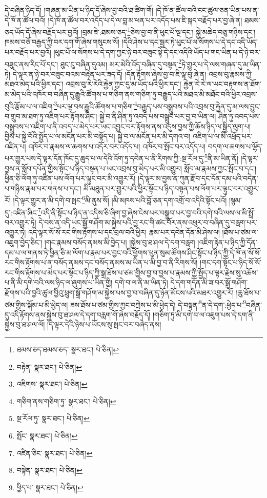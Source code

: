 དེ་བཞིན་ཉིད་དོ། །གཞན་མ་ཡིན་པ་ཉིད་དོ་ཞེས་བྱ་བའི་ཐ་ཚིག་གོ། །དེ་ཁོ་ན་ཚོལ་བའི་ངང་ཚུལ་ཅན་ཡིན་པས་ན་དེ་ཁོ་ན་ཚོལ་བའོ། །དེ་ཁོ་ན་ཚོལ་བར་འདོད་པ་དེ་ལ་བླ་མ་ཕན་པར་འདོད་པས་ཇི་སྐད་བརྗོད་པར་བྱ་ཞེ་ན། ཐམས་ཅད་ཡོད་དོ་ཞེས་བརྗོད་པར་བྱའོ། །བྲམ་ཟེ་:ཐམས་ཅད་\footnote{ཐམས་ཅད་ཐམས་ཅད་  སྣར་ཐང་།  པེ་ཅིན། }ཅེས་བྱ་བ་ནི་ཕུང་པོ་ལྔ་དང་། སྐྱེ་མཆེད་བཅུ་གཉིས་དང་། ཁམས་བཅོ་བརྒྱད་ཀྱི་བར་དག་གོ་ཞེས་གསུངས་སོ། །དེའི་ཤེས་པ་དང་སྦྱར་ཏེ་ཕུང་པོ་ལ་སོགས་པ་དེ་དང་འདི་ཡོད་པར་བརྗོད་པར་བྱའོ། །ཕུང་པོ་ལ་སོགས་པ་དེ་དག་ཀྱང་ཉེ་བར་བཟུང་སྟེ་དེ་དང་འདིའི་ཡོད་པ་གང་ཡིན་པ་དེ་ཉེ་བར་བཟུང་ནས་རིང་པོ་དང་། ཐུང་ངུ་བཞིན་དུའམ། མར་མེའི་འོད་བཞིན་དུ་བསྟན་\footnote{བརྟེན་  སྣར་ཐང་།  པེ་ཅིན། }ཏེ་གྱུར་པ་དེ་ལས་གཞན་དུ་མ་ཡིན་ཏེ། དེ་ལྟར་ན་ཉེ་བར་བཟུང་བའམ་བརྟེན་པར་ཟད་དོ། །དོན་རྟོགས་ཞེས་བྱ་བ་ཇི་ལྟ་བུ་ཞེ་ན། འབྲས་བུ་རྣམས་ཀྱི་མཐའ་མེད་པའི་ཕྱིར་དང་། འབྲས་བུ་རེ་རེའི་རྐྱེན་ཀྱང་དུ་མ་ཡོད་པའི་ཕྱིར་དང་། རྐྱེན་རེ་རེ་ལ་ཡང་བརྟགས་ན་ཐོག་མ་མེད་པའི་འཁོར་བ་བཞིན་དུ་རྒྱུའི་ཚོགས་པ་གཅིག་ནས་གཅིག་ཏུ་བརྒྱུད་པའི་མཐའ་མི་མཐོང་བའི་ཕྱིར་འབྲས་བུའི་རྩོམ་པ་ལ་འཇིག་\footnote{འཇིགས་  སྣར་ཐང་།  པེ་ཅིན། }པར་ལྟ་བས་རྒྱུའི་ཚོགས་པ་གཅིག་\footnote{གཅིག་ནས་གཅིག་ཏུ་  སྣར་ཐང་།  པེ་ཅིན། }བརྒྱུད་པས་བསྒྲུབས་པའི་འབྲས་བུ་རྐྱེན་དུ་མ་ལས་བྱུང་བ་གྲུབ་མ་ཐག་ཏུ་འཇིག་པར་རྟོགས་ཤིང་། སྐྱེ་བ་ནི་ཤིན་ཏུ་འབད་པས་བསྒྲུབ་པར་བྱ་བ་ཡིན་ལ། ཤིན་ཏུ་འབད་པས་བསྒྲུབས་པ་འཇིག་པ་ནི་འབད་པ་མེད་པར་ཡང་འབྱུང་བར་རྟོགས་ནས་འདུས་བྱས་ཀྱི་ཆོས་ཉིད་ལ་སྒྱིད་ལུག་པ། བྱིས་པ་སྐྱེ་བོའི་སྤྱོད་པ་ལ་མངོན་པར་མི་བསྟོད་པ། སྐྱེ་བ་ལ་མངོན་པར་མི་དགའ་བ། འཇིག་པ་ལ་མི་འཕྲོད་པར་འཛིན་པ། འཁོར་བ་རྣམས་ལ་ཆགས་པ་འདོར་བར་འདོད་པ། འཁོར་བ་སྤོང་བར་འདོད་པ། བདག་ལ་ཆགས་པ་ལྷོད་པར་གྱུར་པས་དེ་ལྟར་དོན་ཁོང་དུ་ཆུད་པ་ལ་དེའི་འོག་ཏུ་དབེན་པ་ནི་རིགས་ཀྱི་:སྔ་རོལ་དུ་\footnote{སྔ་རོལ་ཏུ་  སྣར་ཐང་།  པེ་ཅིན། }ནི་མ་ཡིན་ནོ། །དེ་ལྟར་བྱས་ན་སློབ་དཔོན་གྱིས་སྟོང་པ་ཉིད་བསྟན་པ་ཡང་འབྲས་བུ་མེད་པར་མི་འགྱུར། སློབ་མ་རྣམས་ཀྱང་སྤོང་བ་དང་། ཕྱིན་ཅི་ལོག་ཏུ་འཛིན་པས་ལོག་པར་ལྟུང་བར་མི་འགྱུར་རོ། །དེ་ལྟར་མ་བྱས་ན་ཀུན་རྫོབ་དང་དོན་དམ་པའི་བདེན་པ་གཉིས་རྣམ་པར་གནས་པ་དང་། མི་མཐུན་པར་གྱུར་པའི་ཕྱིར་སྟོང་པ་ཉིད་བསྟན་པས་ལོག་པར་ལྟུང་བར་འགྱུར་རོ། །དེ་ལྟར་གྱུར་ན་མི་དགེ་བ་སྤང་\footnote{སྤོང་  སྣར་ཐང་།  པེ་ཅིན། }མི་ནུས་སོ། །མི་མཁས་པའི་བློ་ཅན་དག་འགྲོ་བ་འདིའི་སྟོང་པའོ། །སྙམ་དུ་:འཛིན་ཞིང་\footnote{འཛིན་ཅིང་  སྣར་ཐང་།  པེ་ཅིན། }འདི་ནི་སྟོང་པ་ཉིད་ན་འདིས་ཅི་ཞིག་བྱ་ཞེས་ངེས་པར་བསྒྲུབ་པར་བྱ་བའི་དགེ་བའི་ལས་ལ་མི་སྤྲོ་བར་འགྱུར་ཏེ། དེ་བས་ན་འདི་ཡང་སྒྲོ་གཤོག་མ་སྐྱེས་པའི་བྱ་རང་གི་ཚང་བོར་ནས་འཕུར་བ་བཞིན་དུ་བརླག་པར་འགྱུར་ཏེ། འདི་ལྟར་སོ་སོ་རང་གིས་རྟོགས་པ་དང་བྲལ་བའི་ཕྱིར། རྣམ་པར་དབེན་དོན་མི་ཤེས་ལ། །ཐོས་པ་ཙམ་ལ་འཇུག་བྱེད་ཅིང་། །གང་རྣམས་བསོད་ནམས་མི་བྱེད་པ། །སྐྱེས་བུ་ཐ་ཤལ་དེ་དག་བརླག །འཇིག་རྟེན་པ་ཉིད་ཀྱི་དོན་དམ་པ་ལ་གནས་ཏེ་ཕྱིན་ཅི་མ་ལོག་པ་རྣམ་པར་བྱང་བའི་ཕྱོགས་ཕུན་སུམ་ཚོགས་ཤིང་སྟོང་པ་ཉིད་ཀྱི་དེ་ཁོ་ན་སོ་སོ་རང་གིས་རྟོགས་པ་ན་བསོད་ནམས་དང་བསོད་ནམས་མ་ཡིན་པ་མི་བྱ་བ་ནི་རིགས་སོ། །གང་དག་སྟོང་པ་ཉིད་སོ་སོ་རང་གིས་རྟོགས་པ་མེད་པར་སྟོང་པ་ཉིད་ཀྱི་སྒྲ་ཐོས་པ་ཙམ་གྱིས་བྱ་བ་བྱས་པ་རྣམས་ཀྱི་སྤྱོད་པ་ལྟར་རྗེས་སུ་འཆོས་པ་ནི་མི་དགེ་བའི་ལས་ཉིད་ལ་ཞུགས་པ་ཡིན་གྱི། དགེ་བ་ལ་ནི་མ་ཡིན་ཏེ། དེ་དག་གདོན་མི་ཟ་བར་སྒྲོ་གཤོག་རྫོགས་པའི་བྱའི་ཚུལ་བྱིའུ་ཕྲུག་སྒྲོ་གཤོག་མ་སྐྱེས་པས་བྱ་བ་བཞིན་དུ་ཉོན་མོངས་པའི་མཐར་འགྱུར་རོ། །ཆུ་ཐོས་པ་ཙམ་གྱིས་སྐོམ་པ་མི་ཕྱེད་ལ། ཟས་ཐོས་པ་ཙམ་གྱིས་ཀྱང་བཀྲེས་པ་མི་ཕྱེད་དེ། དེ་བསྟན་\footnote{བསྟེན་  སྣར་ཐང་།  པེ་ཅིན། }ན་དེ་དག་:ཕྱེད་པ་\footnote{ཕྱིད་པ་  སྣར་ཐང་།  པེ་ཅིན། }བཞིན་དུ་འདི་རྟོགས་ནས་སྐྱེས་བུ་ཐ་ཤལ་དེ་དག་བརླག་གོ་ཞེས་བརྗོད་དོ། །གཅིག་ཏུ་མི་དགེ་བ་ལ་འཇུག་པས་དེ་དག་ནི་སྐྱེས་བུ་ཐ་ཤལ་ལོ། །དེ་ལྟར་དེའི་ཉེས་པ་ཡོངས་སུ་སྤང་བར་བཞེད་ནས། 